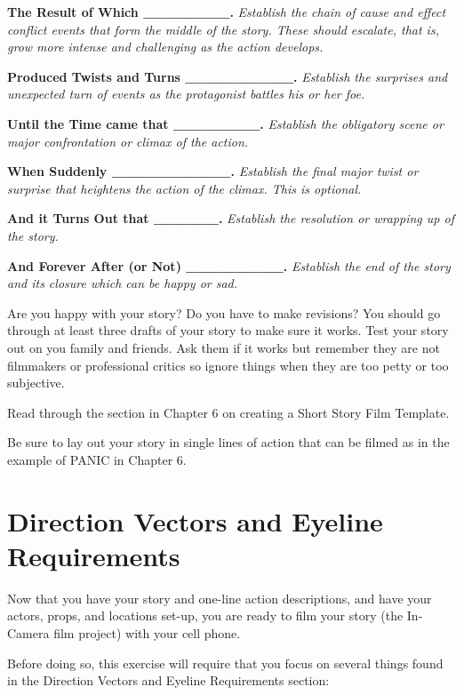 \documentclass[
  letterpaper,
  DIV=11,
  numbers=noendperiod]{scrreprt}
\begin{document}
\begin{tcolorbox}
\textbf{The Result of Which \_\_\_\_\_\_\_\_.} \emph{Establish the chain
of cause and effect conflict events that form the middle of the story.
These should escalate, that is, grow more intense and challenging as the
action develops.}

\textbf{Produced Twists and Turns \_\_\_\_\_\_\_\_\_\_.} \emph{Establish
the surprises and unexpected turn of events as the protagonist battles
his or her foe.}

\textbf{Until the Time came that \_\_\_\_\_\_\_\_.} \emph{Establish the
obligatory scene or major confrontation or climax of the action.}

\textbf{When Suddenly \_\_\_\_\_\_\_\_\_\_\_.} \emph{Establish the final
major twist or surprise that heightens the action of the climax. This is
optional.}

\textbf{And it Turns Out that \_\_\_\_\_\_.} \emph{Establish the
resolution or wrapping up of the story.}

\textbf{And Forever After (or Not) \_\_\_\_\_\_\_\_\_.} \emph{Establish
the end of the story and its closure which can be happy or sad.}

Are you happy with your story? Do you have to make revisions? You should
go through at least three drafts of your story to make sure it works.
Test your story out on you family and friends. Ask them if it works but
remember they are not filmmakers or professional critics so ignore
things when they are too petty or too subjective.

Read through the section in Chapter 6 on creating a Short Story Film
Template.

Be sure to lay out your story in single lines of action that can be
filmed as in the example of PANIC in Chapter 6.

\end{tcolorbox}

\section{Direction Vectors and Eyeline
Requirements}\label{direction-vectors-and-eyeline-requirements}

Now that you have your story and one-line action descriptions, and have
your actors, props, and locations set-up, you are ready to film your
story (the In-Camera film project) with your cell phone.

Before doing so, this exercise will require that you focus on several
things found in the Direction Vectors and Eyeline Requirements section:
\end{document}
